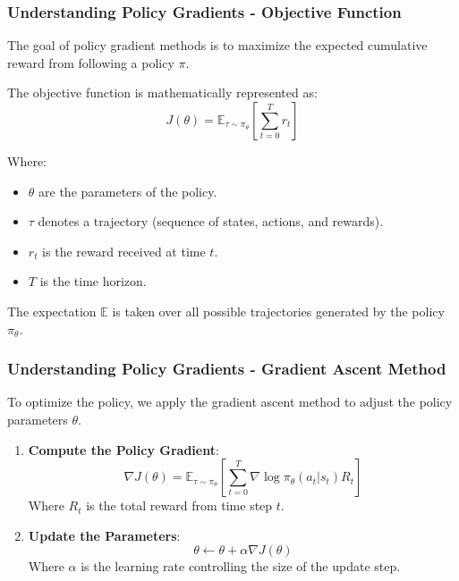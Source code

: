\documentclass[aspectratio=169]{beamer}
\begin{document}
\begin{frame}[fragile]
    \frametitle{Understanding Policy Gradients - Objective Function}
    The goal of policy gradient methods is to maximize the expected cumulative reward from following a policy \( \pi \).

    The objective function is mathematically represented as:
    \begin{equation}
        J(\theta) = \mathbb{E}_{\tau \sim \pi_{\theta}} \left[ \sum_{t=0}^{T} r_t \right]
    \end{equation}
    
    Where:
    \begin{itemize}
        \item \( \theta \) are the parameters of the policy.
        \item \( \tau \) denotes a trajectory (sequence of states, actions, and rewards).
        \item \( r_t \) is the reward received at time \( t \).
        \item \( T \) is the time horizon.
    \end{itemize}
    
    The expectation \( \mathbb{E} \) is taken over all possible trajectories generated by the policy \( \pi_{\theta} \).
\end{frame}

\begin{frame}[fragile]
    \frametitle{Understanding Policy Gradients - Gradient Ascent Method}
    To optimize the policy, we apply the gradient ascent method to adjust the policy parameters \( \theta \).

    \begin{enumerate}
        \item \textbf{Compute the Policy Gradient}:
        \begin{equation}
            \nabla J(\theta) = \mathbb{E}_{\tau \sim \pi_{\theta}} \left[ \sum_{t=0}^{T} \nabla \log \pi_{\theta}(a_t | s_t) R_t \right]
        \end{equation}
        Where \( R_t \) is the total reward from time step \( t \).
        
        \item \textbf{Update the Parameters}:
        \begin{equation}
            \theta \leftarrow \theta + \alpha \nabla J(\theta)
        \end{equation}
        Where \( \alpha \) is the learning rate controlling the size of the update step.
    \end{enumerate}
\end{frame}
\end{document}
